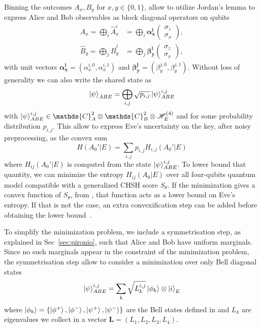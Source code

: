 Binning the outcomes $A_x,B_y$ for $x,y\in\{0,1\}$, allow to utilize Jordan's lemma to express Alice and Bob observables as block diagonal operators on qubits
\begin{equation}
	\begin{split}
		\hat{A}_x = \bigoplus_i \hat{A}_x^i &= \bigoplus_i \mathbf{\alpha_x^i} \begin{pmatrix}\sigma_z \\ \sigma_x\end{pmatrix}, \\
		\hat{B}_y = \bigoplus_j \hat{B}_y^j &= \bigoplus_j \mathbf{\beta_y^i} \begin{pmatrix}\sigma_z \\ \sigma_x\end{pmatrix},
	\end{split}
\end{equation}
with unit vectors $\mathbf{\alpha_x^i} = (\alpha_x^{i,0},\alpha_x^{i,1})$ and $\mathbf{\beta_y^j} = (\beta_y^{j,0},\beta_y^{j,1})$.
Without loss of generality we can also write the shared state as
\begin{equation}
	\ket{\psi}_{ABE} = \bigoplus_{i,j} \sqrt{p_{i,j}} \ket{\psi}_{ABE}^{i,j}	
\end{equation}
with $\ket{\psi}_{ABE}^{i,j} \in \mathds{C}^2_A \otimes \mathds{C}^2_B \otimes \Hil_E^{(4)}$ and for some probability distribution $p_{i,j}$.
This allow to express Eve's uncertainty on the key, after noisy preprocessing, as the convex sum
\begin{equation}
	H(A_0'| E) = \sum_{i,j} p_{i,j} H_{i,j}(A_0' | E)
	\label{eq:H_convex}
\end{equation}
where $H_{ij}(A_0' | E)$ is computed from the state $\ket{\psi}_{ABE}^{i,j}$.
To lower bound that quantity, we can minimize the entropy $H_{ij}(A_0 | E)$ over all four-qubits quantum model compatible with a generalized CHSH score $S_\theta$.
If the minimization gives a convex function of $S_\theta$, from , that function acts as a lower bound on Eve's entropy. 
If that is not the case, an extra convexification step can be added before obtaining the lower bound~\cite{Sekatski2021}.

To simplify the minimization problem, we include a symmetrisation step, as explained in Sec~\ref{sec:pironio}, such that Alice and Bob have uniform marginals.
Since no such marginals appear in the constraint of the minimization problem, the symmetrisation step allow to consider a minimization over only Bell diagonal states~\cite{Pironio2009}
\begin{equation}
	\ket{\psi}_{ABE}^{i,j} = \sum_k \sqrt{L_k^{i,j}} \ket{\phi_k} \otimes \ket{i}_E
	\label{eq:psi_ABE_reduced}
\end{equation}
where $\ket{\phi_k}=\{\ket{\phi^+},\ket{\phi^-},\ket{\psi^+},\ket{\psi^-}\}$ are the Bell states defined in  and $L_k$ are  eigenvalues we collect in a vector $\mathbf{L}=(L_1,L_2,L_3,L_4)$.


